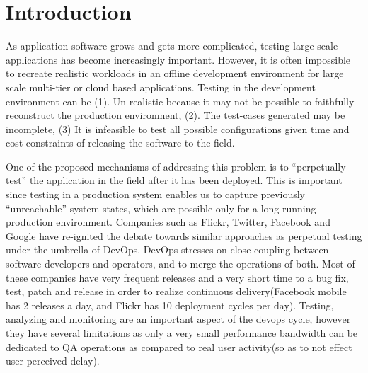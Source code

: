 
\section{Introduction}
\label{sec:intro}



As application software grows and gets more complicated, testing large scale applications has become increasingly important. 
However, it is often impossible to recreate realistic workloads in an offline development environment for large scale multi-tier or cloud based applications.
Testing in the development environment can be (1). Un-realistic because it may not be possible to faithfully reconstruct the production environment, (2). The test-cases generated may be incomplete, (3) It is infeasible to test all possible configurations given time and cost constraints of releasing the software to the field. 

One of the proposed mechanisms of addressing this problem is to ``perpetually test''\cite{perpetual} the application in the field after it has been deployed. 
This is important since testing in a production system enables us to capture previously ``unreachable'' system states, which are possible only for a long running production environment.
Companies such as Flickr, Twitter, Facebook and Google have re-ignited the debate towards similar approaches as perpetual testing under the umbrella of DevOps.
DevOps stresses on close coupling between software developers and operators, and to merge the operations of both. 
Most of these companies have very frequent releases and a very short time to a bug fix, test, patch and release in order to realize continuous delivery(Facebook mobile has 2 releases a day, and Flickr has 10 deployment cycles per day).
Testing, analyzing and monitoring are an important aspect of the devops cycle, however they have several limitations as only a very small performance bandwidth can be dedicated to QA operations as compared to real user activity(so as to not effect user-perceived delay).

